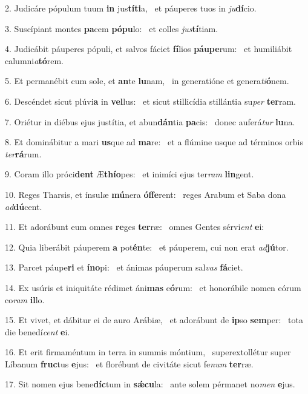 2. Judicáre pópulum tuum \textbf{in} jus\textbf{tí}\textbf{ti}a, \ast\  et páuperes tuos in \textit{ju}\textbf{dí}cio.\

3. Suscípiant montes \textbf{pa}cem \textbf{pó}\textbf{pu}lo: \ast\  et colles \textit{jus}\textbf{tí}tiam.\

4. Judicábit páuperes pópuli, et salvos fáciet \textbf{fí}lios \textbf{páu}\textbf{pe}rum: \ast\  et humiliábit calumni\textit{a}\textbf{tó}rem.\

5. Et permanébit cum sole, et \textbf{an}te \textbf{lu}nam, \ast\  in generatióne et genera\textit{ti}\textbf{ó}nem.\

6. Descéndet sicut plúvi\textbf{a} in \textbf{vel}lus: \ast\  et sicut stillicídia stillántia su\textit{per} \textbf{ter}ram.\

7. Oriétur in diébus ejus justítia, et abun\textbf{dán}tia \textbf{pa}cis: \ast\  donec auferá\textit{tur} \textbf{lu}na.\

8. Et dominábitur a mari \textbf{us}que ad \textbf{ma}re: \ast\  et a flúmine usque ad términos orbis \textit{ter}\textbf{rá}rum.\

9. Coram illo próci\textbf{dent} Æ\textbf{thí}\textbf{o}pes: \ast\  et inimíci ejus ter\textit{ram} \textbf{lin}gent.\

10. Reges Tharsis, et ínsulæ \textbf{mú}nera \textbf{óf}\textbf{fe}rent: \ast\  reges Arabum et Saba dona \textit{ad}\textbf{dú}cent.\

11. Et adorábunt eum omnes \textbf{re}ges \textbf{ter}ræ: \ast\  omnes Gentes sérvi\textit{ent} \textbf{e}i:\

12. Quia liberábit páuperem \textbf{a} pot\textbf{én}te: \ast\  et páuperem, cui non erat \textit{ad}\textbf{jú}tor.\

13. Parcet páupe\textbf{ri} et \textbf{ín}\textbf{o}pi: \ast\  et ánimas páuperum sal\textit{vas} \textbf{fá}ciet.\

14. Ex usúris et iniquitáte rédimet áni\textbf{mas} e\textbf{ó}rum: \ast\  et honorábile nomen eórum co\textit{ram} \textbf{il}lo.\

15. Et vivet, et dábitur ei de auro Arábiæ, \dag\  et adorábunt de \textbf{ip}so \textbf{sem}per: \ast\  tota die benedí\textit{cent} \textbf{e}i.\

16. Et erit firmaméntum in terra in summis móntium, \dag\  superextollétur super Líbanum \textbf{fruc}tus \textbf{e}jus: \ast\  et florébunt de civitáte sicut fe\textit{num} \textbf{ter}ræ.\

17. Sit nomen ejus bene\textbf{díc}tum in \textbf{sǽ}\textbf{cu}la: \ast\  ante solem pérmanet no\textit{men} \textbf{e}jus.\

